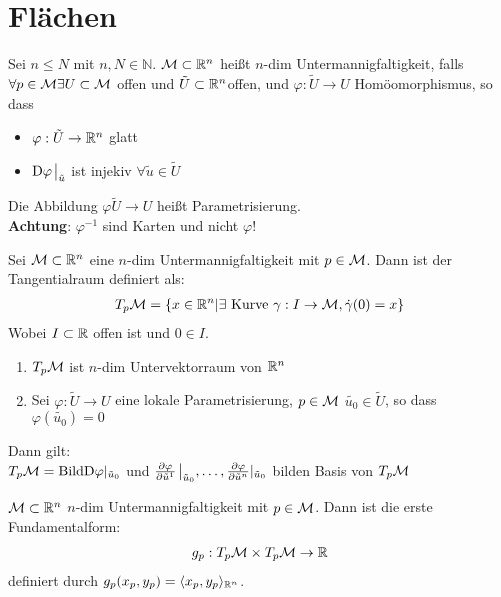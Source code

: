 \section{Flächen}
\begin{defs}
    Sei $n \leq N$ mit $n,N \in \mathbb{N}$.
    $\mathcal{M} \subset \mathbb{R}^n$ heißt $n$-dim Untermannigfaltigkeit, falls $\forall p \in \mathcal{M} \exists U \subset \mathcal{M}$
    offen und $\tilde{U} \subset \mathbb{R}^n$offen, und $\varphi : \tilde{U} \to U$ Homöomorphismus, so dass
\begin{itemize}
    \item $\varphi: \tilde{U} \to \mathbb{R}^n$ glatt
    \item $\covd \varphi \eval_{\tilde{u}}$ ist injekiv $\forall \tilde{u}\in\tilde{U}$
\end{itemize}
Die Abbildung $\varphi \tilde{U} \to U $ heißt Parametrisierung.\\
\textbf{Achtung}: $\varphi^{-1}$ sind Karten und nicht $\varphi$!
\end{defs}
\begin{defs}
Sei $\mathcal{M} \subset \mathbb{R}^n$ eine $n$-dim Untermannigfaltigkeit mit $p\in \mathcal{M}$.
Dann ist der Tangentialraum definiert als:
\begin{align}
    T_p\mathcal{M} = \{ x \in \mathbb{R}^n \vert \exists \ \text{Kurve} \ \gamma : I \to \mathcal{M} , \dot{\gamma}(0) = x \} 
\end{align}
Wobei $I \subset \mathbb{R}$ offen ist und $0 \in I$.
\end{defs}

\begin{satz}
\begin{enumerate}
    \item $T_p\mathcal{M}$ ist $n$-dim Untervektorraum von $\mathbb{R}^n$
    \item Sei $\varphi : \tilde{U}\to U$ eine lokale Parametrisierung, $p\in\mathcal{M}$
        $\tilde{u_0}\in \tilde{U}$, so dass $\varphi (\tilde{u_0})=0$
\end{enumerate}
Dann gilt:\\
$T_p\mathcal{M} = \text{Bild} \mathrm{D} \varphi\vert_{\tilde{u}_0}$ und 
$\pdv{\varphi}{\tilde{u}^1}\eval_{\tilde{u}_0}, \dots , \pdv{\varphi}{\tilde{u}^n} \vert_{\tilde{u}_0}$ bilden Basis von $T_p\mathcal{M}$
\end{satz}

\begin{defs}
    $\mathcal{M} \subset \mathbb{R}^n$ $n$-dim Untermannigfaltigkeit mit $p\in\mathcal{M}$.
    Dann ist die erste Fundamentalform:
    \begin{align}
        g_p : T_p\mathcal{M} \times T_p \mathcal{M} \to \mathbb{R}
    \end{align}
    definiert durch $g_p (x_p , y_p) = \langle x_p , y_p \rangle_{\mathbb{R}^n}$.
\end{defs}

